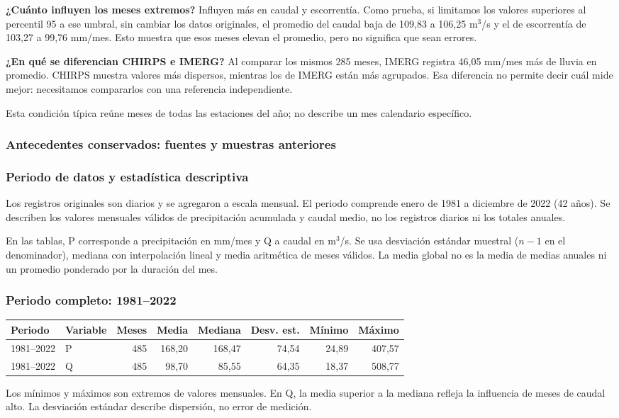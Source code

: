 \documentclass[10pt,a4paper]{article}
\begin{document}
\textbf{¿Cuánto influyen los meses extremos?} Influyen más en caudal y escorrentía. Como prueba, si limitamos los valores superiores al percentil 95 a ese umbral, sin cambiar los datos originales, el promedio del caudal baja de 109,83 a 106,25 m$^3$/s y el de escorrentía de 103,27 a 99,76 mm/mes. Esto muestra que esos meses elevan el promedio, pero no significa que sean errores.

\textbf{¿En qué se diferencian CHIRPS e IMERG?} Al comparar los mismos 285 meses, IMERG registra 46,05 mm/mes más de lluvia en promedio. CHIRPS muestra valores más dispersos, mientras los de IMERG están más agrupados. Esa diferencia no permite decir cuál mide mejor: necesitamos compararlos con una referencia independiente.

Esta condición típica reúne meses de todas las estaciones del año; no describe un mes calendario específico.
\subsubsection*{Antecedentes conservados: fuentes y muestras anteriores}\subsubsection*{Periodo de datos y estadística descriptiva}
Los registros originales son diarios y se agregaron a escala mensual. El periodo
comprende enero de 1981 a diciembre de 2022 (42 años). Se describen los valores
mensuales válidos de precipitación acumulada y caudal medio, no los registros
diarios ni los totales anuales.

En las tablas, P corresponde a precipitación en mm/mes y Q a caudal en m$^3$/s.
Se usa desviación estándar muestral ($n-1$ en el denominador), mediana con
interpolación lineal y media aritmética de meses válidos. La media global no es
la media de medias anuales ni un promedio ponderado por la duración del mes.

\subsubsection*{Periodo completo: 1981--2022}
\begin{center}\small
\begin{center}
\begin{tabular}{llrrrrrr}\hline
Periodo & Variable & Meses & Media & Mediana & Desv. est. & Mínimo & Máximo \\
\hline
1981--2022 & P & 485 & 168,20 & 168,47 & 74,54 & 24,89 & 407,57 \\
1981--2022 & Q & 485 & 98,70 & 85,55 & 64,35 & 18,37 & 508,77 \\
\hline\end{tabular}
\end{center}\end{center}
Los mínimos y máximos son extremos de valores mensuales. En Q, la media superior
a la mediana refleja la influencia de meses de caudal alto. La desviación estándar
describe dispersión, no error de medición.
\end{document}
